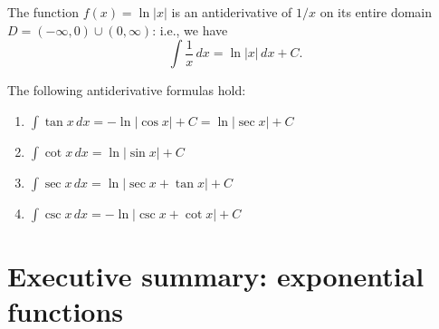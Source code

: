 \begin{corollary}
  The function $f(x)=\ln\lvert x\rvert$ is an antiderivative of $1/x$ on its entire domain $D=(-\infty, 0)\cup (0,\infty)$: i.e., we have
  \[
  \int\frac{1}{x}\, dx=\ln \vert x\rvert\, dx+C.
  \]
\end{corollary}
\begin{namedtheorem}
  The following antiderivative formulas hold:
  \begin{enumerate}
    \item $\displaystyle\int \tan x\, dx=-\ln\lvert \cos x\rvert+C=\ln\lvert\sec x\rvert+C$
    \item $\displaystyle\int \cot x\, dx=\ln\vert \sin x\vert+C$
    \item $\displaystyle\int \sec x\, dx=\ln\vert \sec x+\tan x\vert+C$
    \item $\displaystyle\int \csc x\, dx=-\ln\vert \csc x+\cot x\vert+C$
  \end{enumerate}

\end{namedtheorem}



%





\newpage

\section{Executive summary: exponential functions}

\thispagestyle{fancy}
